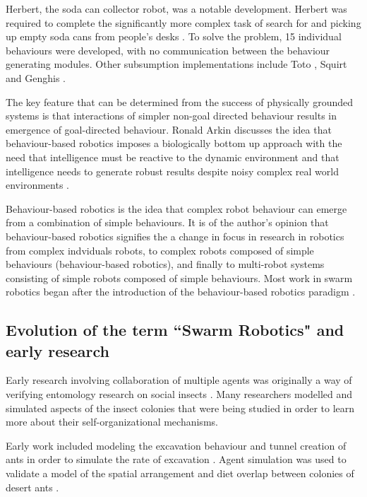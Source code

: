 Herbert, the soda can collector robot, was a notable development. Herbert was required to complete the significantly more complex task of search for and picking up empty soda cans from people's desks \cite{connell1989colony}. To solve the problem, 15 individual behaviours were developed, with no communication between the behaviour generating modules. Other subsumption implementations include Toto \cite{mataric1990distributed}, Squirt \cite{flynn1989world} and Genghis \cite{brooks1989robot}.

The key feature that can be determined from the success of physically grounded systems is that interactions of simpler non-goal directed behaviour results in emergence of goal-directed behaviour. Ronald Arkin discusses the idea that behaviour-based robotics imposes a biologically bottom up approach with the need that intelligence must be reactive to the dynamic environment and that intelligence needs to generate robust results despite noisy complex real world environments \cite{arkin1990integrating}.

Behaviour-based robotics is the idea that complex robot behaviour can emerge from a combination of simple behaviours. It is of the author's opinion that behaviour-based robotics signifies the a change in focus in research in robotics from complex indviduals robots, to complex robots composed of simple behaviours (behaviour-based robotics), and finally to multi-robot systems consisting of simple robots composed of simple behaviours. Most work in swarm robotics began after the introduction of the behaviour-based robotics paradigm \cite{arai2002editorial}.

\subsection{Evolution of the term ``Swarm Robotics" and early research}
\label{early-research}

Early research involving collaboration of multiple agents was originally a way of verifying entomology research on social insects \cite{dorigo2014swarm, beni1993swarm, seeley2009wisdom}. Many researchers modelled and simulated aspects of the insect colonies that were being studied in order to learn more about their self-organizational mechanisms. 

Early work included modeling the excavation behaviour and tunnel creation of ants in order to simulate the rate of excavation \cite{sudd1975model}. Agent simulation was used to validate a model of the spatial arrangement and diet overlap between colonies of desert ants \cite{ryti1984spatial}.

